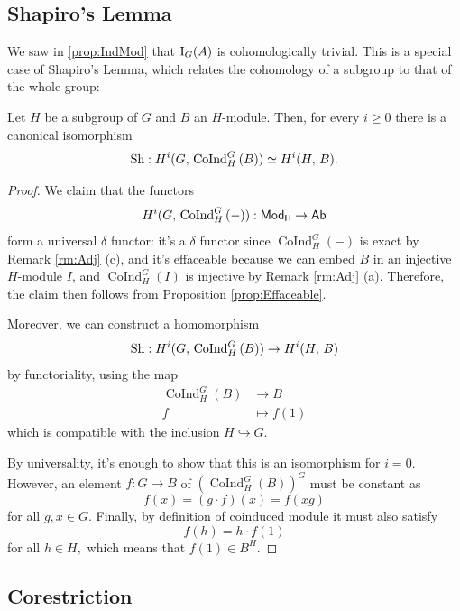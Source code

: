 \documentclass[a4paper, oneside]{memoir}
\begin{document}
\subsection{Shapiro's Lemma}
We saw in \ref{prop:IndMod} that $\mathrm{I}_{G}(A)$ is cohomologically trivial. This is a special case of Shapiro's Lemma, which relates the cohomology of a subgroup to that of the whole group:
\begin{theorem}\label{thm:Shapiro}
    Let $H$ be a subgroup of $G$ and $B$ an $H$-module. Then, for every $i\geq0$ there is a canonical isomorphism
    \[
        \operatorname{Sh}: H^{i}( G, \, \operatorname{CoInd}^G_H{(B)} )\simeq H^{i}( H, \, B ).
    \]
\end{theorem}
\begin{proof}
    We claim that the functors
    \[
        H^{i}( G, \, \operatorname{CoInd}^G_H{(-)} ): \mathsf{Mod}_\mathsf{H}\to\mathsf{Ab}
    \]
    form a universal $\delta$ functor: it's a $\delta$ functor since $\operatorname{CoInd}^G_H{(-)}$ is exact by Remark \ref{rm:Adj} (c), and it's effaceable because we can embed $B$ in an injective $H$-module $I$, and $\operatorname{CoInd}^G_H{(I)}$ is injective by Remark \ref{rm:Adj} (a).
    Therefore, the claim then follows from Proposition \ref{prop:Effaceable}.

    Moreover, we can construct a homomorphism
    \[
        \operatorname{Sh}: H^{i}( G, \, \operatorname{CoInd}^G_H{(B)} )\to H^{i}( H, \, B )
    \]
    by functoriality, using the map
    \begin{align*}
        \operatorname{CoInd}^G_H{(B)} & \to B        \\
        f                             & \mapsto f(1)
    \end{align*}
    which is compatible with the inclusion $H\hookrightarrow G$.

    By universality, it's enough to show that this is an isomorphism for $i=0$. However, an element $f:G\to B$ of $(\operatorname{CoInd}^G_H{(B)})^G$ must be constant as $$f(x)=(g\cdot f)(x)=f(xg)$$ for all $g,x\in G$. Finally, by definition of coinduced module it must also satisfy $$f(h)=h\cdot f(1)$$ for all $h\in H,$ which means that $f(1)\in B^H$.
\end{proof}

\subsection{Corestriction}
\end{document}
